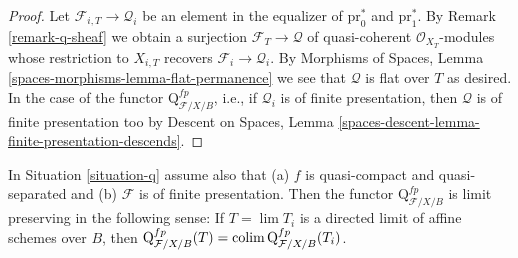 \begin{proof}
Let $\mathcal{F}_{i, T} \to \mathcal{Q}_i$ be an element in the equalizer
of $\text{pr}_0^*$ and $\text{pr}_1^*$. By Remark \ref{remark-q-sheaf}
we obtain a surjection $\mathcal{F}_T \to \mathcal{Q}$ of quasi-coherent
$\mathcal{O}_{X_T}$-modules whose restriction to $X_{i, T}$ recovers
$\mathcal{F}_i \to \mathcal{Q}_i$.
By Morphisms of Spaces, Lemma \ref{spaces-morphisms-lemma-flat-permanence}
we see that $\mathcal{Q}$ is flat over $T$ as desired.
In the case of the functor $\text{Q}^{fp}_{\mathcal{F}/X/B}$, i.e.,
if $\mathcal{Q}_i$ is of finite presentation, then
$\mathcal{Q}$ is of finite presentation too by
Descent on Spaces, Lemma
\ref{spaces-descent-lemma-finite-presentation-descends}.
\end{proof}

\begin{lemma}
\label{lemma-q-limit-preserving}
In Situation \ref{situation-q} assume also that
(a) $f$ is quasi-compact and quasi-separated and
(b) $\mathcal{F}$ is of finite presentation.
Then the functor $\text{Q}^{fp}_{\mathcal{F}/X/B}$
is limit preserving in the following sense: If $T = \lim T_i$ is a
directed limit of affine schemes over $B$, then
$\text{Q}^{fp}_{\mathcal{F}/X/B}(T) =
\mathop{\mathrm{colim}}\nolimits \text{Q}^{fp}_{\mathcal{F}/X/B}(T_i)$.
\end{lemma}

